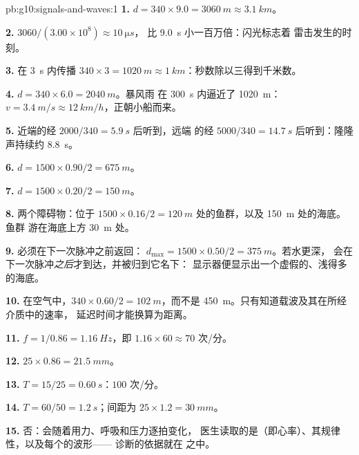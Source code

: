 \begin{solution}{pb:g10:signals-and-waves:1}
\textbf{1.} $d = 340 \times 9.0 = \qty{3060}{m} \approx \qty{3.1}{km}$。

\textbf{2.} $3060/(3.00\times10^{8}) \approx \qty{10}{\micro s}$，
比 \qty{9.0}{s} 小一百万倍：闪光标志着
雷击发生的时刻。

\textbf{3.} 在 \qty{3}{s} 内传播 $340 \times 3 = \qty{1020}{m}
\approx \qty{1}{km}$：秒数除以三得到千米数。

\textbf{4.} $d = 340 \times 6.0 = \qty{2040}{m}$。暴风雨
在 \qty{300}{s} 内逼近了 \qty{1020}{m}：$v = \qty{3.4}{m/s} \approx
\qty{12}{km/h}$，正朝小船而来。

\textbf{5.} 近端的经 $2000/340 = \qty{5.9}{s}$ 后听到，远端
的经 $5000/340 = \qty{14.7}{s}$ 后听到：隆隆声持续约
\qty{8.8}{s}。

\textbf{6.} $d = 1500 \times 0.90/2 = \qty{675}{m}$。

\textbf{7.} $d = 1500 \times 0.20/2 = \qty{150}{m}$。

\textbf{8.} 两个障碍物：位于 $1500 \times 0.16/2 =
\qty{120}{m}$ 处的鱼群，以及 \qty{150}{m} 处的海底。鱼群
游在海底上方 \qty{30}{m} 处。

\textbf{9.} 必须在下一次脉冲之前返回：
$d_{\max} = 1500 \times 0.50/2 = \qty{375}{m}$。若水更深，
会在下一次脉冲\emph{之后}才到达，并被归到它名下：
显示器便显示出一个虚假的、浅得多的海底。

\textbf{10.} 在空气中，$340 \times 0.60/2 = \qty{102}{m}$，而不是
\qty{450}{m}。只有知道载波及其在所经介质中的速率，
延迟时间才能换算为距离。

\textbf{11.} $f = 1/0.86 = \qty{1.16}{Hz}$，即 $1.16 \times 60
\approx 70$ 次/分。

\textbf{12.} $25 \times 0.86 = \qty{21.5}{mm}$。

\textbf{13.} $T = 15/25 = \qty{0.60}{s}$：$100$ 次/分。

\textbf{14.} $T = 60/50 = \qty{1.2}{s}$；间距为
$25 \times 1.2 = \qty{30}{mm}$。

\textbf{15.} 否：会随着用力、呼吸和压力逐拍变化，
医生读取的是（即心率）、其规律性，以及每个的波形——
诊断的依据就在
之中。


\end{solution}
